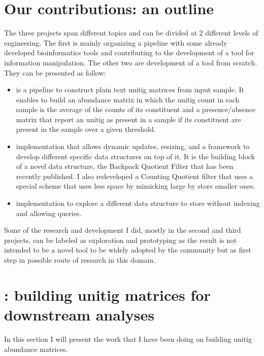 \section{Our contributions: an outline}
The three projects span different topics and can be divided at 2 different levels of engineering. The first is mainly organizing a pipeline with some already developed bioinformatics tools and contributing to the development of a tool for \kmer information manipulation. The other two are development of a tool from scratch.\\
They can be presented as follow:
\begin{itemize}
	\item[\textbf{\muset}] is a pipeline to construct plain text unitig matrices from input sample. It enables to build an abundance matrix in which the unitig count in each sample is the average of the counts of its constituent \kmers and a presence/absence matrix that report an unitig as present in a sample if its constituent \kmers are present in the sample over a given threshold.\\
	\item[\smash{\stackunder{A \textbf{Quotient}}{\textbf{filter}}}] implementation that allows dynamic updates, resizing, and a framework to develop different specific data structures on top of it. It is the building block of a novel data structure, the Backpack Quotient Filter that has been recently published. I also redeveloped a Counting Quotient filter that uses a special scheme that uses less space by mimicking large \kmers by store smaller ones.\\ 
	\item[\smash{\stackunder{A \textbf{Super\kmer}}{\textbf{sorting}}}] implementation to explore a different data structure to store \kmers without indexing and allowing queries.
\end{itemize}
Some of the research and development I did, mostly in the second and third projects, can be labeled as exploration and prototyping as the result is not intended to be a novel tool to be widely adopted by the community but as first step in possible route of research in this domain.

\section{\muset: building unitig matrices for downstream analyses}
In this section I will present the work that I have been doing on building unitig abundance matrices.
